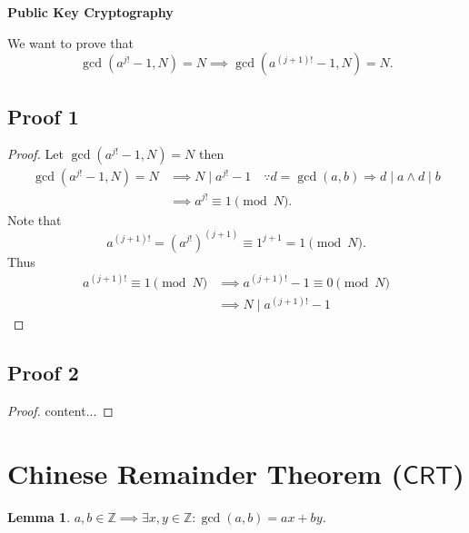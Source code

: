 \documentclass{article}
\newtheorem*{lemma*}{Lemma}
\theoremstyle{definition}
\newcommand{\Z}{\mathbb{Z}}
\newcommand{\of}[1]{\left( #1 \right)}
\begin{document}
\begin{center}
	\huge\textbf{Public Key Cryptography}\\
	\vspace{0.5em}
\end{center}


\noindent We want to prove that \[
\gcd\of{a^{j!}-1,N}=N\implies\gcd\of{a^{(j+1)!}-1,N}=N.
\]
\subsection*{Proof 1}
\begin{proof}
	Let $\gcd\of{a^{j!}-1,N}=N$ then \begin{align*}
	\gcd\of{a^{j!}-1,N}=N&\implies N\mid a^{j!}-1\quad\because d=\gcd(a,b)\Rightarrow d\mid a\land d\mid b\\
	&\implies a^{j!}\equiv 1\pmod{N}.
	\end{align*} Note that \[
	a^{(j+1)!}=\of{a^{j!}}^{(j+1)}\equiv 1^{j+1}=1\pmod{N}.
	\] Thus \begin{align*}
	a^{(j+1)!}\equiv 1\pmod{N}&\implies a^{(j+1)!}-1\equiv 0\pmod{N}\\
	&\implies N\mid a^{(j+1)!}-1
	\end{align*}
\end{proof}

\subsection*{Proof 2}
\begin{proof}
	content...
\end{proof}


\section{Chinese Remainder Theorem ($\mathsf{CRT}$)}

\begin{tcolorbox}[colback=white,colframe=lemcolor,arc=5pt,title={\hypertarget{lem}{}\color{white}\bf Bézout's Identity}]
	\begin{lemma*}
		$a,b\in\Z\implies\exists x,y\in\Z:\gcd\of{a,b}=ax+by$.
	\end{lemma*}
\end{tcolorbox}
\end{document}
